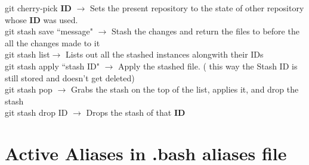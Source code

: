 \documentclass[twoside,a4paper]{article}
\newcommand{\tcb}{\color{blue}}
\newcommand{\tcc}{\color{cyan}}
\newcommand{\tcr}{\color{red}}
\newcommand{\tcg}{\color{gray}}
\newcommand{\tck}{\color{black}}
\newcommand{\ra }{$\rightarrow$ }
\begin{document}
\begin{multicols}{2}
	\tcr git \tcb cherry-pick \textbf{ID} \tck 
	\ra Sets the present repository to the state of other 
	repository whose \textbf{ID} was used.\\
	\tcr git stash \tcb save ``message"\tck 
	\ra Stash the changes and return the files to before the all 
	the changes made to it\\
	\tcr git stash \tcb list\tck $\rightarrow$
	Lists out all the stashed instances alongwith their IDs\\
	\tcr git stash apply \tcb ``stash ID" \tck 
	\ra Apply the stashed file. \tcg  ( this way the 
	Stash ID is still stored and doesn't get deleted)\\
	\tcr git stash \tcb pop \tck \ra Grabs
	the stash on the top of the list, applies it, and drop the stash\\
	\tcr git stash \tcb drop ID \tck \ra 
	Drops the stash of that \textbf{ID}\\

\vfill \null


\tcc \section{Active Aliases in 
.bash \textunderscore aliases file}


\end{multicols}
\end{document}

